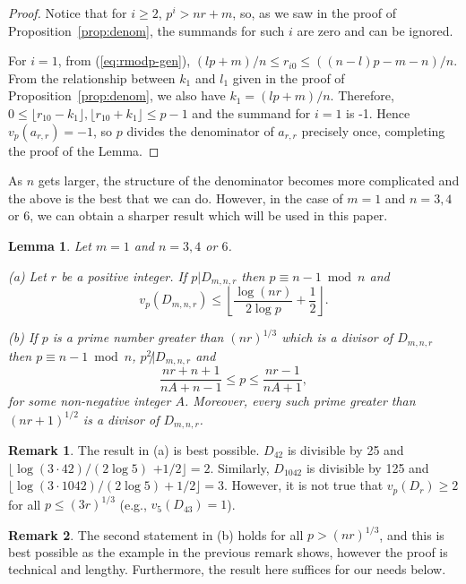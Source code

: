 \documentclass{jT}
\newtheorem{lemma}[theorem]{Lemma}
\theoremstyle{definition}
\newtheorem*{remark}{Remark}
\begin{document}
\begin{proof}
Notice that for $i \geq 2$, $p^{i} > nr+m$, so, as we saw in the proof of
Proposition~\ref{prop:denom}, the summands for such $i$ are zero and can be ignored.

For $i=1$, from (\ref{eq:rmodp-gen}), $(lp+m)/n \leq r_{i0} \leq ((n-l)p-m-n)/n$.
From the relationship between $k_{1}$ and $l_{1}$ given in the proof of
Proposition~\ref{prop:denom}, we also have $k_{1}=(lp+m)/n$. Therefore,
$0 \leq \lfloor r_{10}-k_{1} \rfloor, \lfloor r_{10}+k_{1} \rfloor \leq p-1$ and the
summand for $i=1$ is -1. Hence $v_{p}(a_{r,r})=-1$, so $p$ divides the denominator
of $a_{r,r}$ precisely once, completing the proof of the Lemma.
\end{proof}

As $n$ gets larger, the structure of the denominator becomes more complicated and the
above is the best that we can do. However, in the case of $m=1$ and $n=3, 4$ or $6$,
we can obtain a sharper result which will be used in this paper.

\begin{lemma}
\label{lem:denom-3}
Let $m=1$ and $n=3, 4$ or $6$.

\noindent
{\rm (a)} Let $r$ be a positive integer. If 
$p|D_{m,n,r}$ then $p \equiv n-1 \bmod n$ and 
\begin{displaymath}
v_{p} \left( D_{m,n,r} \right) 
\leq \left\lfloor \frac{\log (nr)}{2 \log p} + \frac{1}{2} \right\rfloor.
\end{displaymath}

\noindent
{\rm (b)} If $p$ is a prime number greater than $(nr)^{1/3}$ 
which is a divisor of $D_{m,n,r}$ then $p \equiv n-1 \bmod n$, 
$p^{2} \not| D_{m,n,r}$ and 
\begin{equation}
\label{eq:pcond-3}
\frac{nr+n+1}{nA+n-1} \leq p \leq \frac{nr-1}{nA+1},  
\end{equation}
for some non-negative integer $A$. Moreover, every such prime 
greater than $(nr+1)^{1/2}$ is a divisor of $D_{m,n,r}$.
\end{lemma}

\begin{remark}
The result in (a) is best possible. $D_{42}$ is divisible by 25 and
$\lfloor \log (3 \cdot 42)/(2 \log 5)$  $+ 1/2 \rfloor =2$.
Similarly, $D_{1042}$ is divisible by 125 and
$\lfloor \log (3 \cdot 1042)/(2 \log 5) + 1/2 \rfloor = 3$. However, it is not
true that $v_{p}(D_{r}) \geq 2$ for all $p \leq(3r)^{1/3}$ (e.g., $v_{5}(D_{43})=1$).
\end{remark}

\begin{remark}
The second statement in (b) holds for all $p > (nr)^{1/3}$, and this
is best possible as the example in the previous remark shows,
however the proof is technical and lengthy. Furthermore, the result
here suffices for our needs below.
\end{remark}
\end{document}
